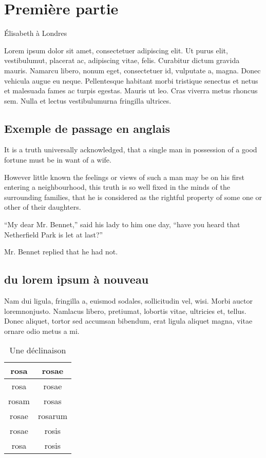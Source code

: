 \documentclass{book}
\begin{document}
\section{Première partie}

Élisabeth à Londres 
\medskip

Lorem ipsum dolor sit amet, consectetuer adipiscing elit. Ut purus elit, vestibulumut, placerat ac, adipiscing vitae, felis.
Curabitur dictum gravida mauris.
Namarcu libero, nonum eget, consectetuer id, vulputate a, magna.
Donec vehicula augue eu neque. Pellentesque habitant morbi tristique senectus et netus et malesuada fames ac turpis egestas.
Mauris ut leo. Cras viverra metus rhoncus sem. Nulla et lectus vestibulumurna fringilla ultrices.


\subsection{Exemple de passage en anglais}


	It is a truth universally acknowledged, that a single man in possession of a good fortune must be in want of a wife.

However little known the feelings or views of such a man may be on his first entering a neighbourhood, this truth is so well fixed in the minds of the surrounding families, that he is considered as the rightful property of some one or other of their daughters.

\enquote{My dear Mr. Bennet,} said his lady to him one day, \enquote{have you heard that Netherfield Park is let at last?}

Mr. Bennet replied that he had not.


\subsection{du lorem ipsum à nouveau}

Nam dui ligula, fringilla a, euismod sodales, sollicitudin vel, wisi. Morbi
auctor loremnonjusto. Namlacus libero, pretiumat, lobortis vitae, ultricies
et, tellus. Donec aliquet, tortor sed accumsan bibendum, erat ligula aliquet
magna, vitae ornare odio metus a mi.

\begin{table}[h]
  \begin{center}
    \begin{tabular}{|c|c|}
      \hline
      rosa & rosae \\
      \hline
      rosa & rosae \\
      \hline
      rosam & rosas \\
      \hline
      rosae & rosarum \\
      \hline
      rosae & rosis \\
      \hline
      rosa & rosis \\
      \hline
    \end{tabular}
  \end{center}
    \caption{Une déclinaison}
  \end{table}
\end{document}
